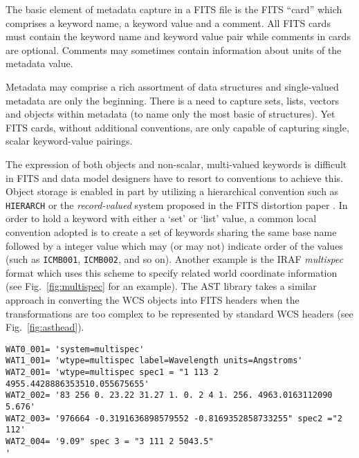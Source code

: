 \documentclass[final,authoryear,5p,times,twocolumn]{elsarticle}
\begin{document}
{{The basic element of metadata capture in a FITS file is the FITS
``card'' which comprises a keyword name, a keyword value and a
comment. All FITS cards must contain the keyword name and keyword
value pair while comments in cards are optional. Comments may
sometimes contain information about units of the metadata value.

Metadata may comprise a rich assortment of data structures and
single-valued metadata are only the beginning. There is a need to
capture sets, lists, vectors and objects within metadata (to name only
the most basic of structures). Yet FITS cards, without additional
conventions, are only capable of capturing single, scalar keyword-value
pairings.

The expression of both objects and non-scalar, multi-valued keywords
is difficult in FITS and data model designers have to resort to
conventions to achieve this. Object storage is enabled in part by
utilizing a hierarchical convention such as \texttt{HIERARCH} or the
\emph{record-valued} system proposed in the FITS distortion paper
\citep{FITSDistort}.  In order to hold a keyword
with either a `set' or `list' value, a common local convention adopted is
to create a set of keywords sharing the same base name followed by a
integer value which may (or may not) indicate order of the values
(such as \texttt{ICMB001}, \texttt{ICMB002}, and so on). Another example
is the IRAF \textit{multispec} format
\citep[see][and references therein]{1993ASPC...52..467V} which uses
this scheme to specify related world coordinate information (see
Fig.~\ref{fig:multispec} for an example).  The AST library
\citep[][and see also \S\ref{sec:wcs}]{1998ASPC..145...41W} takes a
similar approach in converting the WCS objects into FITS headers when
the transformations are too complex to be represented by standard WCS
headers (see Fig.~\ref{fig:asthead}).


\begin{figure*}
\begin{minipage}{\textwidth}
\begin{lstlisting}
WAT0_001= 'system=multispec'
WAT1_001= 'wtype=multispec label=Wavelength units=Angstroms'
WAT2_001= 'wtype=multispec spec1 = "1 113 2 4955.4428886353510.055675655'
WAT2_002= '83 256 0. 23.22 31.27 1. 0. 2 4 1. 256. 4963.0163112090 5.676'
WAT2_003= '976664 -0.3191636898579552 -0.8169352858733255" spec2 ="2 112'
WAT2_004= '9.09" spec 3 = "3 111 2 5043.5"                              '
\end{lstlisting}
\caption{Example header from an IRAF \textit{multispec} dataset
  indicating the use of multi-line headers that differs from the
  \texttt{CONTINUE} convention.}
\label{fig:multispec}
\end{minipage}
\end{figure*}

}}
\end{document}
